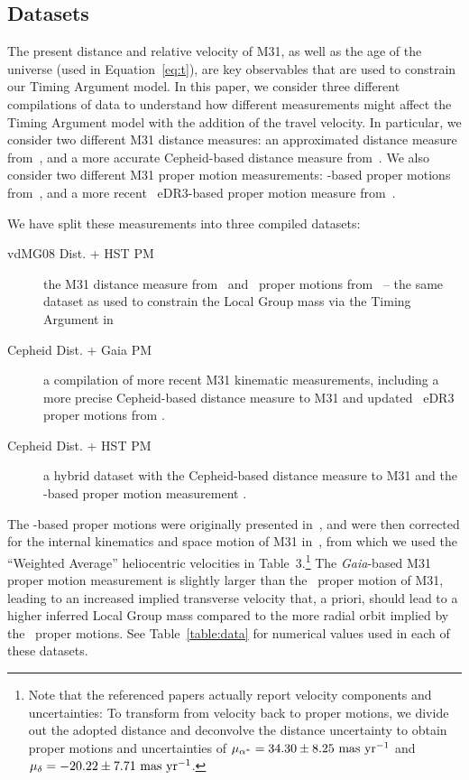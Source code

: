 \documentclass[twocolumn]{aastex631}
\begin{document}
\subsection{Datasets}
\label{sec:datasets}
The present distance and relative velocity of M31, as well as the age of the
universe (used in Equation~\ref{eq:t}), are key observables that are used to
constrain our Timing Argument model. In this paper, we consider three different
compilations of data to understand how different measurements might affect the
Timing Argument model with the addition of the travel velocity. In particular,
we consider two different M31 distance measures: an approximated distance
measure from~\cite{vdm2008}, and a more accurate Cepheid-based distance measure
from~\cite{Li2021}. We also consider two different M31 proper motion
measurements: \hst-based proper motions from~\cite{vdm2012}, and a more recent
\gaia\ eDR3-based proper motion measure from~\cite{Salomon2021}.

We have split these measurements into three compiled datasets:
\begin{description}
  \item[vdMG08 Dist. + HST PM] the
  M31 distance measure from~\cite{vdm2008} and \hst\ proper motions
  from~\citet{vdm2012} -- the same dataset as used to constrain the Local Group
  mass via the Timing Argument
  in~\citet{vdm2012}
  \item[Cepheid Dist. + Gaia PM]  a
  compilation of more recent M31 kinematic measurements, including a more
  precise Cepheid-based distance measure to M31 \citep{Li2021} and updated
  \gaia\ eDR3 proper motions from \citep{Salomon2021}.
  \item[Cepheid Dist. + HST PM] a hybrid dataset with the Cepheid-based distance
  measure to M31 and the \hst-based proper motion measurement
  \citep{Li2021,vdm2012}.
\end{description}
The \hst-based proper motions were originally presented in~\cite{Sohn:2012},
and were then corrected for the internal kinematics and space motion of
M31 in~\cite{vdm2012},
from which we used the ``Weighted Average'' heliocentric
velocities in Table~3.\footnote{
Note that the referenced papers actually report velocity components and
uncertainties: To transform from velocity back to proper motions, we divide out
the adopted distance and deconvolve the distance uncertainty to obtain proper
motions and uncertainties of $\mu_{\alpha^*} = 34.30 \pm 8.25~\mathrm{mas}~\mathrm{yr}^{-1}$ and
$\mu_{\delta} = -20.22 \pm 7.71~\mathrm{mas}~\mathrm{yr}^{-1}$.
}
The \textit{Gaia}-based M31 proper motion measurement is slightly larger than
the \hst\ proper motion of M31, leading to an increased implied transverse
velocity that, a priori, should lead to a higher inferred Local Group mass
compared to the more radial orbit implied by the \hst\ proper motions.
See Table~\ref{table:data} for numerical values used in each of these datasets.
\end{document}
